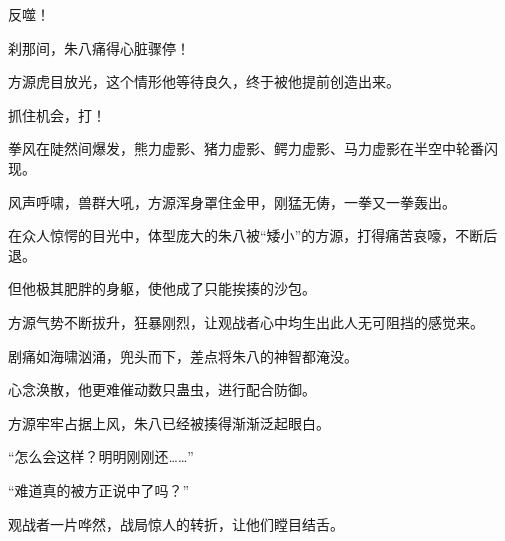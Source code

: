 \begin{this_body}
反噬！

刹那间，朱八痛得心脏骤停！

方源虎目放光，这个情形他等待良久，终于被他提前创造出来。

抓住机会，打！

拳风在陡然间爆发，熊力虚影、猪力虚影、鳄力虚影、马力虚影在半空中轮番闪现。

风声呼啸，兽群大吼，方源浑身罩住金甲，刚猛无俦，一拳又一拳轰出。

在众人惊愕的目光中，体型庞大的朱八被“矮小”的方源，打得痛苦哀嚎，不断后退。

但他极其肥胖的身躯，使他成了只能挨揍的沙包。

方源气势不断拔升，狂暴刚烈，让观战者心中均生出此人无可阻挡的感觉来。

剧痛如海啸汹涌，兜头而下，差点将朱八的神智都淹没。

心念涣散，他更难催动数只蛊虫，进行配合防御。

方源牢牢占据上风，朱八已经被揍得渐渐泛起眼白。

“怎么会这样？明明刚刚还……”

“难道真的被方正说中了吗？”

观战者一片哗然，战局惊人的转折，让他们瞠目结舌。

\end{this_body}

